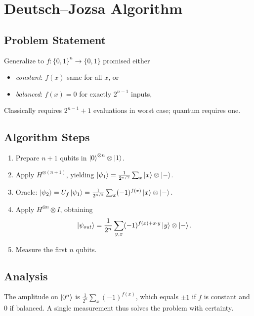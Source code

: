 \newpage
\section{Deutsch--Jozsa Algorithm}
\label{sec:DeutschJozsa}
\subsection{Problem Statement}
Generalize to $f:\{0,1\}^n\to\{0,1\}$ promised either
\begin{itemize}
	\item \emph{constant}: $f(x)$ same for all $x$, or
	\item \emph{balanced}: $f(x)=0$ for exactly $2^{n-1}$ inputs,
\end{itemize}
Classically requires $2^{n-1}+1$ evaluations in worst case; quantum requires one.

\subsection{Algorithm Steps}
\begin{enumerate}
	\item Prepare $n+1$ qubits in $\ket{0}^{\otimes n}\otimes\ket{1}$.
	\item Apply $H^{\otimes(n+1)}$, yielding
	$\ket{\psi_1}=\tfrac1{2^{n/2}}\sum_{x}\ket{x}\otimes\ket{-}$.
	\item Oracle: $\ket{\psi_2}=U_f\ket{\psi_1}=\tfrac1{2^{n/2}}\sum_x(-1)^{f(x)}\ket{x}\otimes\ket{-}$.
	\item Apply $H^{\otimes n}\otimes I$, obtaining
	\[
	\ket{\psi_{out}}=\frac1{2^n}\sum_{y,x}(-1)^{f(x)+x\cdot y}\ket{y}\otimes\ket{-}.
	\]
	\item Measure the first $n$ qubits.
\end{enumerate}

\subsection{Analysis}
The amplitude on $\ket{0^n}$ is \(\displaystyle\frac{1}{2^n}\sum_x(-1)^{f(x)}\),
which equals $\pm1$ if $f$ is constant and $0$ if balanced.  A single measurement thus solves the problem with certainty.


